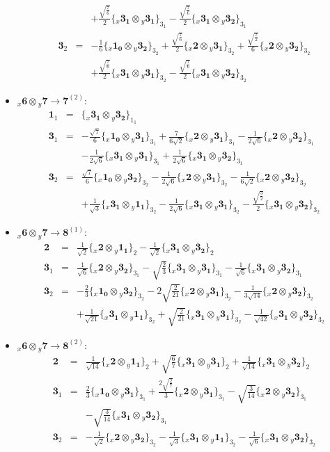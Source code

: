 \documentclass[english]{article}
\newcommand{\rep}[1]{\mathbf{#1}}
\newcommand{\repx}[2]{{}_{#2}\mathbf{#1}}
\newcommand{\subcg}[3]{\big\{ \repx{#1}{x}\otimes\repx{#2}{y}\big\}^{}_{#3}}
\begin{document}
\begin{itemize}
\begin{eqnarray*}
 & & +\frac{\sqrt{\frac{7}{6}}}{2}\subcg{3_{1}}{3_{1}}{3_{1}}-\frac{\sqrt{\frac{7}{6}}}{2}\subcg{3_{1}}{3_{2}}{3_{1}}
\\
\rep{3}_{2} &=& -\frac{1}{6}\subcg{1_{0}}{3_{2}}{3_{2}}+\frac{\sqrt{\frac{7}{6}}}{2}\subcg{2}{3_{1}}{3_{2}}+\frac{\sqrt{\frac{7}{2}}}{6}\subcg{2}{3_{2}}{3_{2}} \\ 
 & & +\frac{\sqrt{\frac{7}{6}}}{2}\subcg{3_{1}}{3_{1}}{3_{2}}-\frac{\sqrt{\frac{7}{6}}}{2}\subcg{3_{1}}{3_{2}}{3_{2}}
\end{eqnarray*}
\item $\repx{6}{x}\otimes\repx{7}{y}\to\rep{7}^{(2)}$:
\begin{eqnarray*}
\rep{1}_{1} &=& \subcg{3_{1}}{3_{2}}{1_{1}}
\\
\rep{3}_{1} &=& -\frac{\sqrt{7}}{6}\subcg{1_{0}}{3_{1}}{3_{1}}+\frac{7}{6 \sqrt{2}}\subcg{2}{3_{1}}{3_{1}}-\frac{1}{2 \sqrt{6}}\subcg{2}{3_{2}}{3_{1}} \\ 
 & & -\frac{1}{2 \sqrt{6}}\subcg{3_{1}}{3_{1}}{3_{1}}+\frac{1}{2 \sqrt{6}}\subcg{3_{1}}{3_{2}}{3_{1}}
\\
\rep{3}_{2} &=& \frac{\sqrt{7}}{6}\subcg{1_{0}}{3_{2}}{3_{2}}-\frac{1}{2 \sqrt{6}}\subcg{2}{3_{1}}{3_{2}}-\frac{1}{6 \sqrt{2}}\subcg{2}{3_{2}}{3_{2}} \\ 
 & & +\frac{1}{\sqrt{3}}\subcg{3_{1}}{1_{1}}{3_{2}}-\frac{1}{2 \sqrt{6}}\subcg{3_{1}}{3_{1}}{3_{2}}-\frac{\sqrt{\frac{3}{2}}}{2}\subcg{3_{1}}{3_{2}}{3_{2}}
\end{eqnarray*}
\item $\repx{6}{x}\otimes\repx{7}{y}\to\rep{8}^{(1)}$:
\begin{eqnarray*}
\rep{2} &=& \frac{1}{\sqrt{2}}\subcg{2}{1_{1}}{2}-\frac{1}{\sqrt{2}}\subcg{3_{1}}{3_{2}}{2}
\\
\rep{3}_{1} &=& \frac{1}{\sqrt{6}}\subcg{2}{3_{2}}{3_{1}}-\sqrt{\frac{2}{3}}\subcg{3_{1}}{3_{1}}{3_{1}}-\frac{1}{\sqrt{6}}\subcg{3_{1}}{3_{2}}{3_{1}}
\\
\rep{3}_{2} &=& -\frac{2}{3}\subcg{1_{0}}{3_{2}}{3_{2}}-2 \sqrt{\frac{2}{21}}\subcg{2}{3_{1}}{3_{2}}-\frac{1}{3 \sqrt{14}}\subcg{2}{3_{2}}{3_{2}} \\ 
 & & +\frac{1}{\sqrt{21}}\subcg{3_{1}}{1_{1}}{3_{2}}+\sqrt{\frac{2}{21}}\subcg{3_{1}}{3_{1}}{3_{2}}-\frac{1}{\sqrt{42}}\subcg{3_{1}}{3_{2}}{3_{2}}
\end{eqnarray*}
\item $\repx{6}{x}\otimes\repx{7}{y}\to\rep{8}^{(2)}$:
\begin{eqnarray*}
\rep{2} &=& \frac{1}{\sqrt{14}}\subcg{2}{1_{1}}{2}+\sqrt{\frac{6}{7}}\subcg{3_{1}}{3_{1}}{2}+\frac{1}{\sqrt{14}}\subcg{3_{1}}{3_{2}}{2}
\\
\rep{3}_{1} &=& \frac{2}{3}\subcg{1_{0}}{3_{1}}{3_{1}}+\frac{2 \sqrt{\frac{2}{7}}}{3}\subcg{2}{3_{1}}{3_{1}}-\sqrt{\frac{3}{14}}\subcg{2}{3_{2}}{3_{1}} \\ 
 & & -\sqrt{\frac{3}{14}}\subcg{3_{1}}{3_{2}}{3_{1}}
\\
\rep{3}_{2} &=& -\frac{1}{\sqrt{2}}\subcg{2}{3_{2}}{3_{2}}-\frac{1}{\sqrt{3}}\subcg{3_{1}}{1_{1}}{3_{2}}-\frac{1}{\sqrt{6}}\subcg{3_{1}}{3_{2}}{3_{2}}
\end{eqnarray*}
\end{itemize}
\end{document}
